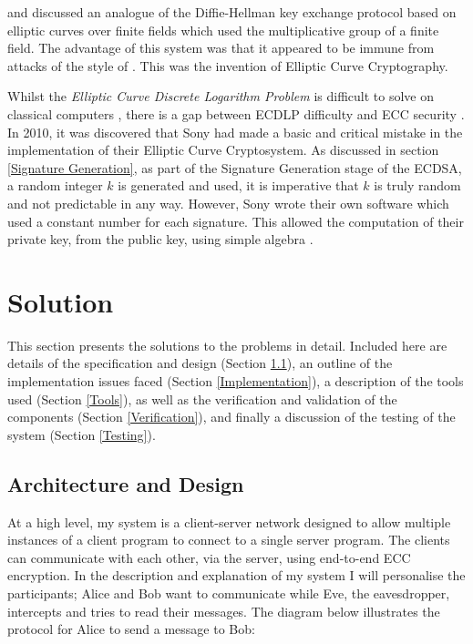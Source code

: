 \documentclass[12pt,a4paper]{article}
\begin{document}
\cite{10.1007/3-540-39799-X_31} and \cite{koblitz1987elliptic} discussed an analogue of the Diffie-Hellman key exchange protocol based on elliptic curves over finite fields which used the multiplicative group of a finite field. 
The advantage of this system was that it appeared to be immune from attacks of the style of \cite{10.1007/3-540-39799-X_31,4568001}. 
This was the invention of Elliptic Curve Cryptography. 

Whilst the \emph{Elliptic Curve Discrete Logarithm Problem} is difficult to solve on classical computers \cite{hankerson2003guide}, 
there is a gap between ECDLP difficulty and ECC security \cite{bernstein2013safecurves}. 
In 2010, it was discovered that Sony had made a basic and critical mistake in the implementation of their Elliptic Curve Cryptosystem. 
As discussed in section \ref{Signature Generation}, as part of the Signature Generation stage of the ECDSA, a random integer $k$ is generated and used, 
it is imperative that $k$ is truly random and not predictable in any way. 
However, Sony wrote their own software which used a constant number for each signature. 
This allowed the computation of their private key, from the public key, using simple algebra \cite{hotz2010console}.


\section{Solution}
This section presents the solutions to the problems in detail. 
Included here are details of the specification and design (Section \ref{Specification}), 
an outline of the implementation issues faced (Section \ref{Implementation}), 
a description of the tools used (Section \ref{Tools}), 
as well as the verification and validation of the components (Section \ref{Verification}), 
and finally a discussion of the testing of the system (Section \ref{Testing}). 

\subsection{Architecture and Design} \label{Specification}
At a high level, my system is a client-server network designed to allow 
multiple instances of a client program to connect to a single server program. 
The clients can communicate with each other, via the server, using end-to-end ECC encryption. 
In the description and explanation of my system I will personalise the participants; 
Alice and Bob want to communicate while Eve, the eavesdropper, intercepts and tries to read their messages. 
The diagram below illustrates the protocol for Alice to send a message to Bob: 
\end{document}
